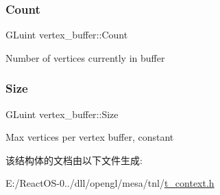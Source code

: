 \subsubsection{\texorpdfstring{Count}{Count}}
{\footnotesize\ttfamily G\+Luint vertex\+\_\+buffer\+::\+Count}

Number of vertices currently in buffer \mbox{\label{structvertex__buffer_a0effd747a55027c36761aa6bbf104696}} 
\subsubsection{\texorpdfstring{Size}{Size}}
{\footnotesize\ttfamily G\+Luint vertex\+\_\+buffer\+::\+Size}

Max vertices per vertex buffer, constant 

该结构体的文档由以下文件生成\+:\begin{DoxyCompactItemize}
\item 
E\+:/\+React\+O\+S-\/0../dll/opengl/mesa/tnl/\hyperlink{t__context_8h}{t\+\_\+context.\+h}\end{DoxyCompactItemize}
